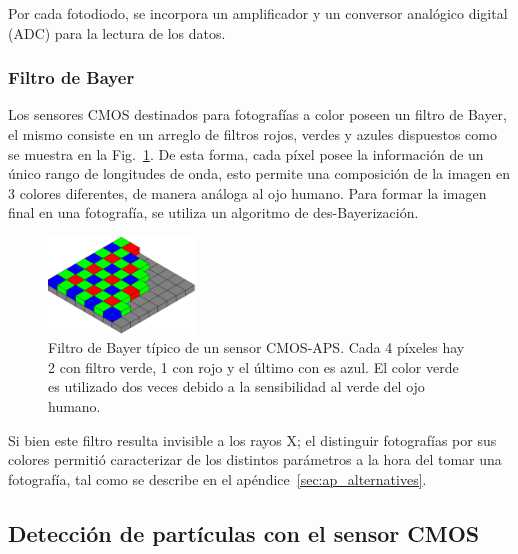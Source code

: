 \documentclass[twoside,twocolumn]{article}
\begin{document}
      Por cada fotodiodo, se incorpora un amplificador y un conversor analógico digital (ADC) para la lectura de los datos.

    \subsubsection{Filtro de Bayer}\label{sec:intro:bayer}

      Los sensores CMOS destinados para fotografías a color poseen un filtro de Bayer, 
      el mismo consiste en un arreglo de filtros rojos, verdes y azules dispuestos como se muestra en la Fig.~\ref{fig:bayer}.
      De esta forma, cada píxel posee la información de un único rango de longitudes de onda, 
      esto permite una composición de la imagen en 3 colores diferentes, de manera análoga al ojo humano.
      Para formar la imagen final en una fotografía, se utiliza un algoritmo de des-Bayerización.\cite{picamera}

      \begin{figure}[h]
        \centering
        \includegraphics[width=0.35\textwidth]{figures/Bayer_pattern.png}
        \caption{Filtro de Bayer típico de un sensor CMOS-APS. Cada 4 píxeles hay 2 con filtro verde, 1 con rojo y el último con es azul.
          El color verde es utilizado dos veces debido a la sensibilidad al verde del ojo humano.}
        \label{fig:bayer}
      \end{figure}

      Si bien este filtro resulta invisible a los rayos X; %
      el distinguir fotografías por sus colores permitió caracterizar
      de los distintos parámetros a la hora del tomar una fotografía,
      tal como se describe en el apéndice~\ref{sec:ap_alternatives}.

    \subsection{Detección de partículas con el sensor CMOS}\label{sec:intro:detection
    }   
\end{document}
